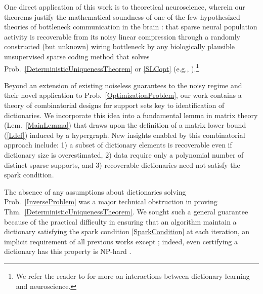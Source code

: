 \documentclass[journal, twocolumn]{IEEEtran}
\begin{document}
One direct application of this work is to theoretical neuroscience, wherein our theorems justify the mathematical soundness of one of the few hypothesized theories of bottleneck communication in the brain \cite{Isely10}: that sparse neural population activity is recoverable from its noisy linear compression through a randomly constructed (but unknown) wiring bottleneck by any biologically plausible unsupervised sparse coding method that solves Prob.~\ref{DeterministicUniquenessTheorem} or \ref{SLCopt} (e.g., \cite{rehnsommer2007, rozell2007neurally, pehlevan2015normative}).\footnote{We refer the reader to \cite{ganguli2012compressed} for more on interactions between dictionary learning and neuroscience.}






Beyond an extension of existing noiseless guarantees \cite{Hillar15} to the noisy regime and their novel application to Prob.~\ref{OptimizationProblem}, our work contains a theory of combinatorial designs for support sets key to identification of dictionaries. We incorporate this idea into a fundamental lemma in matrix theory (Lem.~\ref{MainLemma}) that draws upon the definition of a matrix lower bound (\ref{Ldef}) induced by a hypergraph. New insights enabled by this combinatorial approach include: 1) a subset of dictionary elements is recoverable even if dictionary size is overestimated, 2) data require only a polynomial number of distinct sparse supports, and 3) recoverable dictionaries need not satisfy the spark condition. 

The absence of any assumptions about dictionaries solving Prob.~\ref{InverseProblem} was a major technical obstruction in proving Thm.~\ref{DeterministicUniquenessTheorem}. We sought such a general guarantee because of the practical difficulty in ensuring that an algorithm maintain a dictionary satisfying the spark condition \eqref{SparkCondition} at each iteration, an implicit requirement of all previous works except \cite{Hillar15}; indeed, even certifying a dictionary has this property is NP-hard \cite{tillmann2014computational}.
\end{document}
